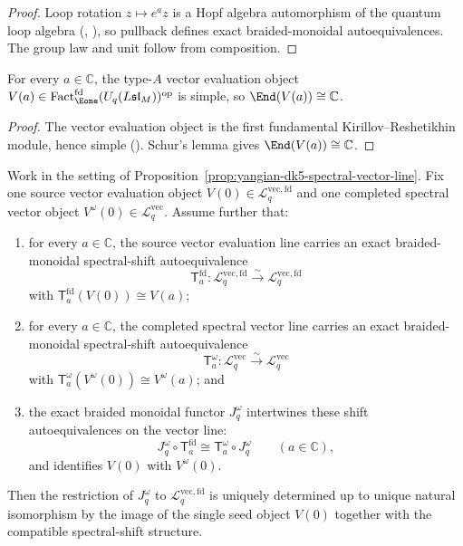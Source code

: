 \begin{proof}
Loop rotation \(z\mapsto e^a z\) is a Hopf algebra automorphism of the
quantum loop algebra (\cite[Ch.~12]{ChariPressley94},
\cite[\S2]{Hernandez05}), so pullback defines exact braided-monoidal
autoequivalences. The group law and unit follow from composition.
\end{proof}

\begin{lemma}
\label{lem:quantum-fd-vector-seed-schur}
For every \(a\in\mathbb C\), the type-$A$ vector evaluation object
\(V(a)\in \operatorname{Fact}_{\Eone}^{\mathrm{fd}}(U_q(L\mathfrak{sl}_M))^{\mathrm{op}}\)
is simple, so \(\End(V(a))\cong \mathbb C\).
\end{lemma}

\begin{proof}
The vector evaluation object is the first fundamental
Kirillov--Reshetikhin module, hence simple (\cite[Ch.~12]{ChariPressley94}).
Schur's lemma gives \(\End(V(a))\cong\mathbb C\).
\end{proof}

\begin{proposition}
\label{prop:yangian-dk5-spectral-vector-seed}
Work in the setting of
Proposition~\ref{prop:yangian-dk5-spectral-vector-line}. Fix one
source vector evaluation object \(V(0)\in
\mathcal{L}^{\mathrm{vec,fd}}_{q}\) and one completed spectral vector
object \(V^\omega(0)\in \mathcal{L}^{\mathrm{vec}}_{q}\). Assume
further that:
\begin{enumerate}[label=\textup{(\roman*)}]
\item for every \(a\in \mathbb{C}\), the source vector evaluation line
 carries an exact braided-monoidal spectral-shift autoequivalence
 \[
 \mathsf{T}^{\mathrm{fd}}_a\colon
 \mathcal{L}^{\mathrm{vec,fd}}_{q}\xrightarrow{\sim}
 \mathcal{L}^{\mathrm{vec,fd}}_{q}
 \]
 with \(\mathsf{T}^{\mathrm{fd}}_a(V(0))\cong V(a)\);
\item for every \(a\in \mathbb{C}\), the completed spectral vector line
 carries an exact braided-monoidal spectral-shift autoequivalence
 \[
 \mathsf{T}^{\omega}_a\colon
 \mathcal{L}^{\mathrm{vec}}_{q}\xrightarrow{\sim}
 \mathcal{L}^{\mathrm{vec}}_{q}
 \]
 with \(\mathsf{T}^{\omega}_a(V^\omega(0))\cong V^\omega(a)\); and
\item the exact braided monoidal functor \(J_q^\omega\) intertwines
 these shift autoequivalences on the vector line:
 \[
 J_q^\omega\circ \mathsf{T}^{\mathrm{fd}}_a
 \cong
 \mathsf{T}^{\omega}_a\circ J_q^\omega
 \qquad (a\in \mathbb{C}),
 \]
 and identifies \(V(0)\) with \(V^\omega(0)\).
\end{enumerate}
Then the restriction of \(J_q^\omega\) to
\(\mathcal{L}^{\mathrm{vec,fd}}_{q}\) is uniquely determined up to
unique natural isomorphism by the image of the single seed object
\(V(0)\) together with the compatible spectral-shift structure.
\end{proposition}

